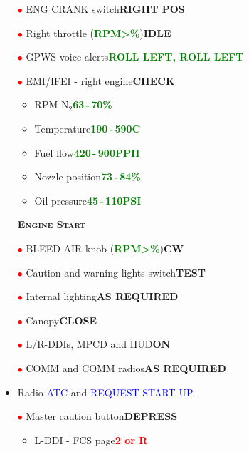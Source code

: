 \documentclass[a4paper,12pt,dvipsnames]{letter}
\newcommand{\radio}[1]{\textcolor{blue}{#1}}
\newcommand{\button}[1]{\textbf{#1}}
\newcommand{\degC}{\textdegree{}C}
\newcommand{\ok}[1]{\textcolor{Green}{\textbf{#1}}}
\newcommand{\warn}[1]{\textcolor{Red}{\textbf{#1}}}
\newcommand{\myHead}[1]{{\LARGE\textsc{\textbf{#1}}}}
\newcommand{\ri}{\textcolor{red}{$\bullet$\;}}
\begin{document}
{\begin{itemize}
\begin{itemize}
 \end{itemize}
 \item[\ri] ENG CRANK switch\dotfill\button{RIGHT POS}
 \item[\ri] Right throttle (\ok{RPM\;>\%})\dotfill\button{IDLE}
 \item[\ri] GPWS voice alerts\dotfill\dotfill\ok{ROLL LEFT, ROLL LEFT}
 \item[\ri]EMI/IFEI - right engine\dotfill\button{CHECK}
 \begin{itemize}
  \item RPM N$_2$\dotfill\ok{63\,-\,70\%}
  \item Temperature\dotfill\ok{190\,-\,590\degC}
  \item Fuel flow\dotfill\ok{420\,-\,900\;PPH}
  \item Nozzle position\dotfill\ok{73\,-\,84\%}
  \item Oil pressure\dotfill\ok{45\,-\,110\;PSI}
 \end{itemize}
\end{itemize}
\newpage
\begin{itemize}
 \item[] \myHead{Engine Start} 
 \item[\ri] BLEED AIR knob (\ok{RPM\;>\%})\dotfill\button{CW\textdegree}
 \item[\ri] Caution and warning lights switch\dotfill\button{TEST}
 \item[\ri] Internal lighting\dotfill\button{AS REQUIRED}
 \item[\ri] Canopy\dotfill\button{CLOSE}
 \item[\ri] L/R-DDIs, MPCD and HUD\dotfill\button{ON}
 \item[\ri] COMM and COMM radios\dotfill\button{AS REQUIRED}
 \item Radio \radio{ATC} and \radio{REQUEST START-UP}.
 \item[\ri] Master caution button\dotfill\button{DEPRESS}
 \begin{itemize}
  \item L-DDI - FCS page\dotfill\warn{2 or R}

\end{itemize}
\end{itemize}}
\end{document}
